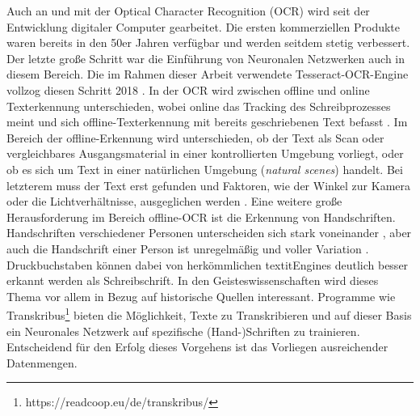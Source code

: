 Auch an und mit der Optical Character Recognition (OCR) wird seit der Entwicklung digitaler Computer gearbeitet. Die ersten kommerziellen Produkte waren bereits in den 50er Jahren verfügbar \cite{eikvil} und werden seitdem stetig verbessert. Der letzte große Schritt war die Einführung von Neuronalen Netzwerken auch in diesem Bereich. Die im Rahmen dieser Arbeit verwendete Tesseract-OCR-Engine vollzog diesen Schritt 2018 \cite{tesseractrelease}.
In der OCR wird zwischen offline und online Texterkennung unterschieden, wobei online das Tracking des Schreibprozesses meint und sich offline-Texterkennung mit bereits geschriebenen Text befasst \cite{feldmann}. Im Bereich der offline-Erkennung wird unterschieden, ob der Text als Scan oder vergleichbares Ausgangsmaterial in einer kontrollierten Umgebung vorliegt, oder ob es sich um Text in einer natürlichen Umgebung (\textit{natural scenes}) handelt. Bei letzterem muss der Text erst gefunden und Faktoren, wie der Winkel zur Kamera oder die Lichtverhältnisse, ausgeglichen werden \cite{forsberg} \cite{qixiangye} \cite{xilinchen}.
Eine weitere große Herausforderung im Bereich offline-OCR ist die Erkennung von Handschriften. Handschriften verschiedener Personen unterscheiden sich stark voneinander \cite{sumedhahallale}, aber auch die Handschrift einer Person ist unregelmäßig und voller Variation \cite{feldmann}. Druckbuchstaben können dabei von herkömmlichen textit{Engines} deutlich besser erkannt werden als Schreibschrift. In den Geisteswissenschaften wird dieses Thema vor allem in Bezug auf historische Quellen interessant. Programme wie Transkribus\footnote{https://readcoop.eu/de/transkribus/} bieten die Möglichkeit, Texte zu Transkribieren und auf dieser Basis ein Neuronales Netzwerk auf spezifische (Hand-)Schriften zu trainieren. Entscheidend für den Erfolg dieses Vorgehens ist das Vorliegen ausreichender Datenmengen. 


